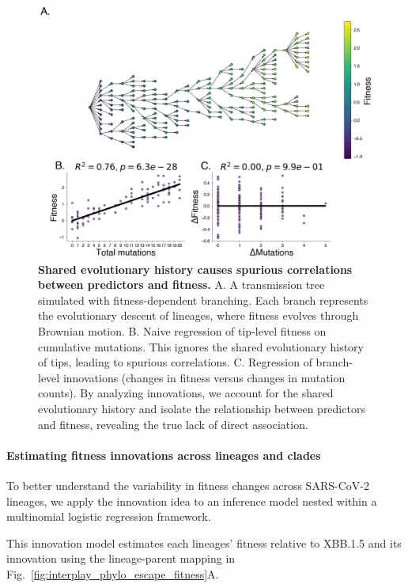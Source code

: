 \begin{figure}[h]
    \centering
    \includegraphics[width=1.0\textwidth]{./figures/synthetic-spurious-correlations.png}
    \caption{
	\textbf{Shared evolutionary history causes spurious correlations between predictors and fitness.}
	A. A transmission tree simulated with fitness-dependent branching.
	Each branch represents the evolutionary descent of lineages, where fitness evolves through Brownian motion.
	B. Naive regression of tip-level fitness on cumulative mutations.
	This ignores the shared evolutionary history of tips, leading to spurious correlations.
	C. Regression of branch-level innovations (changes in fitness versus changes in mutation counts).
	By analyzing innovations, we account for the shared evolutionary history and isolate the relationship between predictors and fitness, revealing the true lack of direct association.
    }
    \label{fig:shared_history_spurious_correlation}
\end{figure}


\paragraph{Estimating fitness innovations across lineages and clades}

To better understand the variability in fitness changes across SARS-CoV-2 lineages, we apply the innovation idea to an inference model nested within a multinomial logistic regression framework.

This innovation model estimates each lineages' fitness relative to XBB.1.5 and its innovation using the lineage-parent mapping in Fig.~\ref{fig:interplay_phylo_escape_fitness}A.

